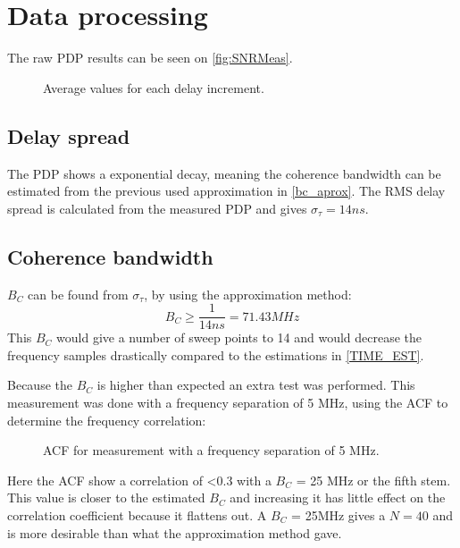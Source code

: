 \newpage
\section{Data processing}
The raw PDP results can be seen on \autoref{fig:SNRMeas}.

\begin{figure}[H]
\centering

\caption{Average values for each delay increment.}
\label{fig:SNRMeas}
\end{figure}

\subsection{Delay spread}
The PDP shows a exponential decay, meaning the coherence bandwidth can be estimated from the previous used approximation in \autoref{bc_aprox}. The RMS delay spread is calculated from the measured PDP and gives $\sigma_{\tau} = 14ns$.

\subsection{Coherence bandwidth}\label{sec:coherence_bandwidth}

$B_C$ can be found from $\sigma_{\tau}$, by using the approximation method:
\begin{equation}
B_C \geq \frac{1}{14ns} = 71.43 MHz 
\end{equation}
This $B_C$ would give a number of sweep points to 14 and would decrease the frequency samples drastically compared to the estimations in \autoref{TIME_EST}.

Because the $B_C$ is higher than expected an extra test was performed. This measurement was done with a frequency separation of 5 MHz, using the \gls{ACF} to determine the frequency correlation:

\begin{figure}[H]
\centering

\caption{\Gls{ACF} for measurement with a frequency separation of 5 MHz.} 
\label{fig:coh_test}
\end{figure}

Here the \gls{ACF} show a correlation of <0.3 with a $B_C$ = 25 MHz or the fifth stem. This value is closer to the estimated $B_C$ and increasing it has little effect on the correlation coefficient because it flattens out. A $B_C$ = 25MHz gives a $N = 40$ and is more desirable than what the approximation method gave.

